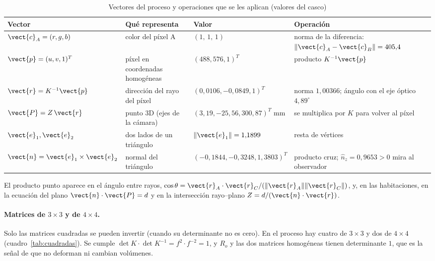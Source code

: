 \begin{table}[htbp]
\caption{Vectores del proceso y operaciones que se les aplican (valores del casco)}
\label{tab:vectores-proceso}
\centering\small
\begin{tabular}{@{}p{2.3cm}p{3.0cm}p{4.9cm}p{4.0cm}@{}}
\toprule
Vector & Qué representa & Valor & Operación \\
\midrule
$\vect{c}_A=(r,g,b)$ & color del píxel A & $(1,\,1,\,1)$ & norma de la diferencia: $\lVert\vect{c}_A-\vect{c}_B\rVert=405{,}4$ \\
$\vect{p}=(u,v,1)^{T}$ & píxel en coordenadas homogéneas & $(488,576,1)^{T}$ & producto $K^{-1}\vect{p}$ \\
$\vect{r}=K^{-1}\vect{p}$ & dirección del rayo del píxel & $(0{,}0106,-0{,}0849,1)^{T}$ & norma $1{,}00366$; ángulo con el eje óptico $4{,}89^\circ$ \\
$\vect{P}=Z\,\vect{r}$ & punto 3D (ejes de la cámara) & $(3{,}19,-25{,}56,300{,}87)^{T}$ mm & se multiplica por $K$ para volver al píxel \\
$\vect{e}_1,\vect{e}_2$ & dos lados de un triángulo & $\lVert\vect{e}_1\rVert=1{,}1899$ & resta de vértices \\
$\vect{n}=\vect{e}_1\times\vect{e}_2$ & normal del triángulo & $(-0{,}1844,-0{,}3248,1{,}3803)^{T}$ & producto cruz; $\hat n_z=0{,}9653>0$ mira al observador \\
\bottomrule
\end{tabular}
\end{table}

El producto punto aparece en el ángulo entre rayos, $\cos\theta=\vect{r}_A\cdot\vect{r}_C/(\lVert\vect{r}_A\rVert\lVert\vect{r}_C\rVert)$, y, en las
habitaciones, en la ecuación del plano $\vect{n}\cdot\vect{P}=d$ y en la intersección rayo--plano $Z=d/(\vect{n}\cdot\vect{r})$.

\paragraph{Matrices de $3\times3$ y de $4\times4$.} Solo las matrices cuadradas se pueden invertir (cuando su determinante no es cero). En el proceso hay
cuatro de $3\times3$ y dos de $4\times4$ (cuadro~\ref{tab:cuadradas}). Se cumple $\det K\cdot\det K^{-1}=f^2\cdot f^{-2}=1$, y $R_o$ y las dos matrices
homogéneas tienen determinante $1$, que es la señal de que no deforman ni cambian volúmenes.

